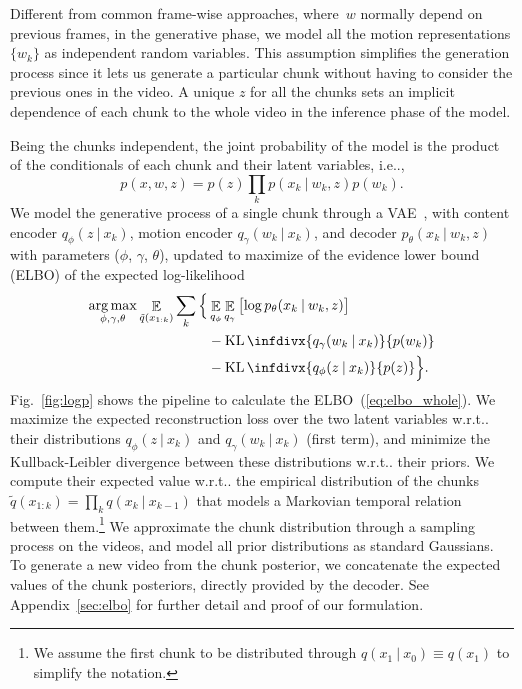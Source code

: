 \documentclass[journal]{IEEEtran}
\makeatletter
\newcommand{\kl}{\operatorname{KL}\infdivx}
\newcommand\givenbase[1][]{\:#1\lvert\:}
\let\given\givenbase
\DeclareMathOperator*{\argmax}{arg\,max}
\DeclareMathOperator*{\E}{\mathbb{E}}
\DeclareRobustCommand\onedot{\futurelet\@let@token\@onedot}
\def\@onedot{\ifx\@let@token.\else.\null\fi\xspace}
\def\ie{{i.e}\onedot} \def\Ie{{I.e}\onedot}
\def\wrt{w.r.t\onedot} \def\dof{d.o.f\onedot}
\makeatother
\begin{document}
Different from common frame-wise approaches, where~$w$ normally depend on previous frames, in the generative phase, we model all the motion representations $\{w_k\}$ as independent random variables.
This assumption simplifies the generation process since it lets us generate a particular chunk without having to consider the previous ones in the video.
A unique $z$ for all the chunks sets an implicit dependence of each chunk to the whole video in the inference phase of the model.

Being the chunks independent, the joint probability of the model is the product of the conditionals of each chunk and their latent variables, \ie,
\begin{equation}
p(x, w, z) = p(z)\prod_k p(x_{k} \given w_k, z)p(w_k).
\end{equation}
We model the generative process of a single chunk through a VAE~\cite{Kingma2013}, with content encoder $q_\phi(z \given x_{k})$, motion encoder $q_\gamma(w_k \given x_{k})$, and decoder $p_\theta(x_{k} \given w_k, z)$ with parameters ($\phi$, $\gamma$, $\theta$), updated to maximize of the evidence lower bound (ELBO) of the expected log-likelihood
\begin{align}
\argmax_{\phi, \gamma, \theta} \E_{\tilde{q}(x_{1:k})} \sum_k \Big\lbrace & \E_{q_\phi}\E_{q_\gamma} \left[\log p_\theta(x_k \given w_k, z) \right] \nonumber \\
& - \kl{q_\gamma(w_k \given x_k)}{p(w_k)} \nonumber \\
& - \kl{q_\phi(z \given x_k)}{p(z)} \Big\rbrace.
\label{eq:elbo_whole}
\end{align}
Fig.~\ref{fig:logp} shows the pipeline to calculate the ELBO~(\ref{eq:elbo_whole}).
We maximize the expected reconstruction loss over the two latent variables \wrt their distributions $q_\phi(z \given x_{k})$ and $q_\gamma(w_k \given x_{k})$ (first term), and minimize the Kullback-Leibler divergence between these distributions \wrt their priors.
We compute their expected value \wrt the empirical distribution of the chunks $\tilde{q}(x_{1:k}) = \prod_k q(x_{k} \given x_{k-1})$ that models a Markovian temporal relation between them.\footnote{We assume the first chunk to be distributed through $q(x_1 \given x_0) \equiv q(x_1)$ to simplify the notation.}
We approximate the chunk distribution through a sampling process on the videos, and model all prior distributions as standard Gaussians.
To generate a new video from the chunk posterior, we concatenate the expected values of the chunk posteriors, directly provided by the decoder.
See Appendix~\ref{sec:elbo} for further detail and proof of our formulation.
\end{document}
